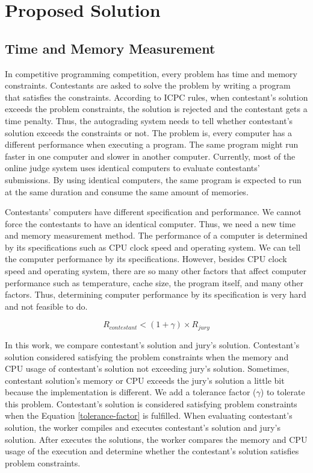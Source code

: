 \documentclass[conference,a4paper]{IEEEtran}
\begin{document}
\section{Proposed Solution}

\subsection{Time and Memory Measurement}

In competitive programming competition, every problem has time and memory constraints. Contestants are asked to solve the problem by writing a program that satisfies the constraints. According to ICPC rules, when contestant's solution exceeds the problem constraints, the solution is rejected and the contestant gets a time penalty. Thus, the autograding system needs to tell whether contestant's solution exceeds the constraints or not. The problem is, every computer has a different performance when executing a program. The same program might run faster in one computer and slower in another computer. Currently, most of the online judge system uses identical computers to evaluate contestants' submissions. By using identical computers, the same program is expected to run at the same duration and consume the same amount of memories.

Contestants' computers have different specification and performance. We cannot force the contestants to have an identical computer. Thus, we need a new time and memory measurement method. The performance of a computer is determined by its specifications such as CPU clock speed and operating system. We can tell the computer performance by its specifications. However, besides CPU clock speed and operating system, there are so many other factors that affect computer performance such as temperature, cache size, the program itself, and many other factors. Thus, determining computer performance by its specification is very hard and not feasible to do.

\begin{equation}\label{tolerance-factor}
R_{contestant} < (1 + \gamma) \times R_{jury}
\end{equation}

In this work, we compare contestant's solution and jury's solution. Contestant's solution considered satisfying the problem constraints when the memory and CPU usage of contestant's solution not exceeding jury's solution. Sometimes, contestant solution's memory or CPU exceeds the jury's solution a little bit because the implementation is different. We add a tolerance factor ($\gamma$) to tolerate this problem. Contestant's solution is considered satisfying problem constraints when the Equation \ref{tolerance-factor} is fulfilled. When evaluating contestant's solution, the worker compiles and executes contestant's solution and jury's solution. After executes the solutions, the worker compares the memory and CPU usage of the execution and determine whether the contestant's solution satisfies problem constraints. 
\end{document}
